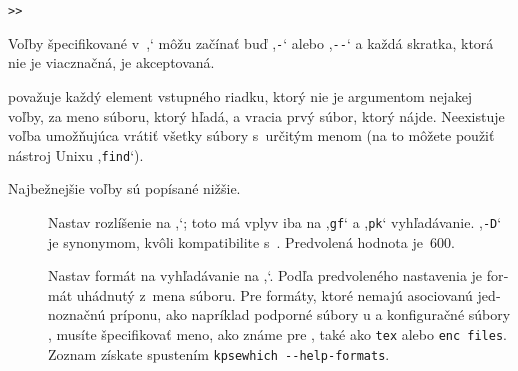 \documentclass[\classoptions,slovak,english,czech]{\classname}
\newcommand{\singleuv}[1]{,#1`}
\begin{document}
\begin{otherlanguage}{slovak}
\begin{alltt}
>> 
\end{alltt}
Voľby špecifikované v~\singleuv{\texttt{}} môžu začínať buď
\singleuv{\texttt{-}} alebo \singleuv{\texttt{-{}-}} a 
každá skratka, ktorá nie je viacznačná, je akceptovaná.

\KPS{} považuje každý element vstupného riadku, ktorý nie je
argumentom nejakej voľby, za meno súboru, ktorý hľadá, a
vracia prvý súbor, ktorý nájde. Neexistuje voľba umožňujúca
vrátiť všetky súbory s~určitým menom (na to môžete použiť
nástroj Unixu \singleuv{\texttt{find}}).

Najbežnejšie voľby sú popísané nižšie.
\begin{description}
\item[]\hfill\break
  Nastav rozlíšenie na \singleuv{\texttt{}}; toto má vplyv iba na
  \singleuv{\texttt{gf}} a \singleuv{\texttt{pk}} vyhľadávanie. \singleuv{\texttt{-D}} je synonymom, kvôli
  kompatibilite s~.  Predvolená hodnota je~600.
\item[]\hfill\break
  Nastav formát na vyhľadávanie na \singleuv{\texttt{}}. Podľa
  predvoleného nastavenia je formát uhádnutý z~mena súboru. Pre formáty,
ktoré nemajú asociovanú jednoznačnú príponu, ako napríklad podporné
  súbory \MP u a konfiguračné súbory , musíte
  špecifikovať meno, ako známe pre \KPS{}, také ako
   \texttt{tex} alebo \texttt{enc files}. Zoznam získate spustením 
   \texttt{kpsewhich -{}-help-formats}.


\end{description}
\end{otherlanguage}
\end{document}
